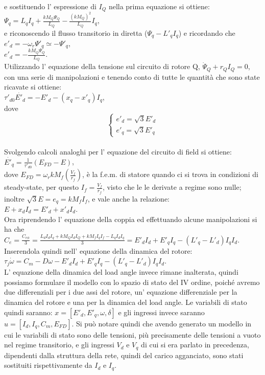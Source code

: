 \documentclass[Lau,noexaminfo]{sapthesis}
\begin{document}
	e sostituendo l' espressione di $I_Q$ nella prima equazione si ottiene:\\
	$\Psi_q=L_qI_q+\frac{kM_Q\Psi_Q}{L_Q}-\frac{(kM_Q)^2}{L_Q}I_q$,\\
	e riconoscendo il flusso transitorio in diretta ($\Psi_q-L'_qI_q$) e ricordando che $e'_d=-\omega_r\Psi'_q\simeq -\Psi'_q$,\\
	$e'_d=-\frac{kM_Q\Psi_Q}{L_Q}$.\\
	Utilizzando l' equazione della tensione sul circuito di rotore Q, $\dot{\Psi}_Q+r_QI_Q=0$, con una serie di manipolazioni e tenendo conto di tutte le quantità che sono state ricavate si ottiene:\\
	$\tau'_{d0} \dot{E'_d}=-E'_d-(x_q-x'_q)I_q$, \\dove
	\[
	\begin{cases}
	e'_d=\sqrt{3}E'_d\\
	e'_q=\sqrt{3}E'_q
	\end{cases}
	\]\\
	Svolgendo calcoli analoghi per l' equazione del circuito di field si ottiene:\\
	$\dot{E'_q}=\frac{1}{\tau'_{d0}}(E_{FD}-E)$,\\
	dove $E_{FD}=\omega_rkM_f(\frac{V_f}{r_f})$, è la f.e.m. di statore quando ci si trova in condizioni di steady-state, per questo $I_f=\frac{V_f}{r_f}$, visto che le le derivate a regime sono nulle; inoltre $\sqrt{3}E=e_q=kM_fI_f$, e vale anche la relazione:\\ $E+x_dI_d=E'_d+x'_dI_d$.\\
	Ora riprendendo l' equazione della coppia ed effettuando alcune manipolazioni si ha che\\
	$C_e=\frac{C_{e\phi}}{3}=\frac{L_dI_dI_q+kM_QI_dI_Q+kM_fI_qI_f-L_qI_dI_q}{3}=E'_dI_d+E'_qI_q-(L'_q-L'_d)I_qI_d$.\\
	Inserendola quindi nell' equazione della dinamica del rotore:\\
	$\tau_j\dot{\omega}=C_m-D\omega-E'_dI_d+E'_qI_q-(L'_q-L'_d)I_qI_d$.\\
	L' equazione della dinamica del load angle invece rimane inalterata, quindi possiamo formulare il modello con lo spazio di stato del IV ordine, poiché avremo due differenziali per i due assi del rotore, un' equazione differenziale per la dinamica del rotore e una per la dinamica del load angle. Le variabili di stato quindi saranno: $x=[E'_d,E'_q,\omega,\delta]$ e gli ingressi invece saranno $u=[I_d,I_q,C_m,E_{FD}]$. Si può notare quindi che avendo generato un modello in cui le variabili di stato sono delle tensioni, più precisamente delle tensioni a vuoto nel regime transitorio, e gli ingressi $V_d$ e $V_q$ di cui si era parlato in precedenza, dipendenti dalla struttura della rete, quindi del carico agganciato, sono stati sostituiti rispettivamente da $I_d$ e $I_q$.\\
\end{document}
